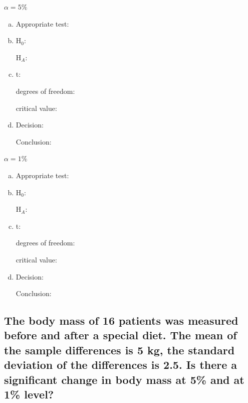 	\begin{minipage}{0.45\textwidth}
	$\alpha=5\%$
	
		\begin{enumerate}[a)]
		\item Appropriate test: \hrulefill
		\item H$_0:$	 \hrulefill

			 H$_A$:	 \hrulefill
		\item t: 	 \hrulefill

			degrees of freedom: \hrulefill 

			critical value: \hrulefill
		\item Decision: 	 \hrulefill

				Conclusion: \hrulefill
		\end{enumerate}
	\end{minipage}
	\hfill
	\begin{minipage}{0.45\textwidth}
		$\alpha=1\%$
		
		\begin{enumerate}[a)]
		\item Appropriate test: \hrulefill
		\item H$_0:$	 \hrulefill

			 H$_A$:	 \hrulefill
		\item t: 	 \hrulefill

			degrees of freedom: \hrulefill 

			critical value: \hrulefill
		\item Decision: 	 \hrulefill

				Conclusion: \hrulefill
		\end{enumerate}
	\end{minipage}

\subsection{The body mass of 16 patients was measured before and after a special diet. The mean of the sample differences is 5 kg, the standard deviation of the differences is 2.5. Is there a significant change in body mass at 5\% and at 1\% level?}
	
